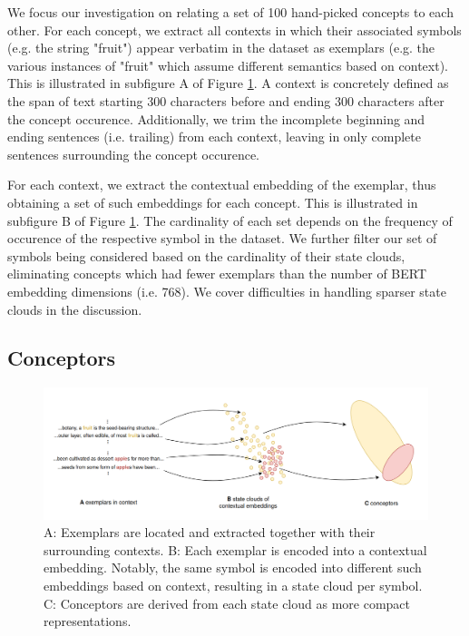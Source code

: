 We focus our investigation on relating a set of 100 hand-picked concepts to each other. For each concept, we extract all contexts in which their associated symbols (e.g. the string "fruit") appear verbatim in the dataset as exemplars (e.g. the various instances of "fruit" which assume different semantics based on context). This is illustrated in subfigure A of Figure \ref{fig:exemplars-conceptors}. A context is concretely defined as the span of text starting 300 characters before and ending 300 characters after the concept occurence. Additionally, we trim the incomplete beginning and ending sentences (i.e. trailing) from each context, leaving in only complete sentences surrounding the concept occurence.

For each context, we extract the contextual embedding of the exemplar, thus obtaining a set of such embeddings for each concept. This is illustrated in subfigure B of Figure \ref{fig:exemplars-conceptors}. The cardinality of each set depends on the frequency of occurence of the respective symbol in the dataset. We further filter our set of symbols being considered based on the cardinality of their state clouds, eliminating concepts which had fewer exemplars than the number of BERT embedding dimensions (i.e. 768). We cover difficulties in handling sparser state clouds in the discussion.

\subsection{Conceptors}

\begin{figure}[h]
    \centering
    \includegraphics[width=\textwidth]{img/exemplars-conceptors.png}
    \caption{A: Exemplars are located and extracted together with their surrounding contexts. B: Each exemplar is encoded into a contextual embedding. Notably, the same symbol is encoded into different such embeddings based on context, resulting in a state cloud per symbol. C: Conceptors are derived from each state cloud as more compact representations.}\label{fig:exemplars-conceptors}
\end{figure}

